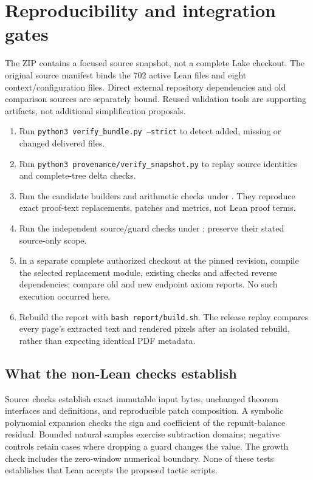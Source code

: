 \section{Reproducibility and integration gates}
The ZIP contains a focused source snapshot, not a complete Lake checkout. The original source manifest binds the 702 active Lean files and eight context/configuration files. Direct external repository dependencies and old comparison sources are separately bound. Reused validation tools are supporting artifacts, not additional simplification proposals.

\begin{enumerate}
\item Run \texttt{python3 verify\_bundle.py --strict} to detect added, missing or changed delivered files.
\item Run \texttt{python3 provenance/verify\_snapshot.py} to replay source identities and complete-tree delta checks.
\item Run the candidate builders and arithmetic checks under . They reproduce exact proof-text replacements, patches and metrics, not Lean proof terms.
\item Run the independent source/guard checks under ; preserve their stated source-only scope.
\item In a separate complete authorized checkout at the pinned revision, compile the selected replacement module, existing checks and affected reverse dependencies; compare old and new endpoint axiom reports. No such execution occurred here.
\item Rebuild the report with \texttt{bash report/build.sh}. The release replay compares every page's extracted text and rendered pixels after an isolated rebuild, rather than expecting identical PDF metadata.
\end{enumerate}

\subsection{What the non-Lean checks establish}
Source checks establish exact immutable input bytes, unchanged theorem interfaces and definitions, and reproducible patch composition. A symbolic polynomial expansion checks the sign and coefficient of the repunit-balance residual. Bounded natural samples exercise subtraction domains; negative controls retain cases where dropping a guard changes the value. The growth check includes the zero-window numerical boundary. None of these tests establishes that Lean accepts the proposed tactic scripts.

